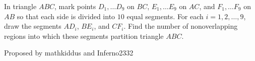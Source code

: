In triangle $ABC$, mark points $D_1, \dots D_{9}$ on $BC$, $E_1, \dots E_{9}$ on $AC$, and $F_1, \dots F_{9}$ on $AB$ so that each side is divided into $10$ equal segments. For each $i=1, 2, \dots, 9$, draw the segments $AD_i$, $BE_i$, and $CF_i$. Find the number of nonoverlapping regions into which these segments partition triangle $ABC$.



 Proposed by mathkiddus and Inferno2332
